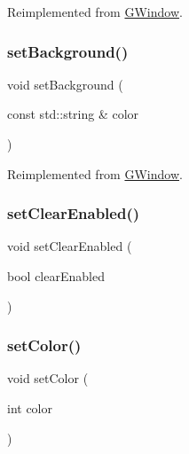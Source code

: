Reimplemented from \mbox{\hyperlink{classGWindow_a427fefbbc34e39e5df27a807da488e0d}{G\+Window}}.

\mbox{\label{classGConsoleWindow_a222fcfb542aa6094c7e0de671bd69627}} 
\subsubsection{\texorpdfstring{set\+Background()}{setBackground()}\hspace{0.1cm}{\footnotesize\ttfamily [2/2]}}
{\footnotesize\ttfamily void set\+Background (\begin{DoxyParamCaption}\item[{const std\+::string \&}]{color }\end{DoxyParamCaption})\hspace{0.3cm}{\ttfamily [virtual]}}



Reimplemented from \mbox{\hyperlink{classGWindow_a222fcfb542aa6094c7e0de671bd69627}{G\+Window}}.

\mbox{\label{classGConsoleWindow_a9d6a359503a0bc164ae8ea1389cff050}} 
\subsubsection{\texorpdfstring{set\+Clear\+Enabled()}{setClearEnabled()}}
{\footnotesize\ttfamily void set\+Clear\+Enabled (\begin{DoxyParamCaption}\item[{bool}]{clear\+Enabled }\end{DoxyParamCaption})\hspace{0.3cm}{\ttfamily [virtual]}}

\mbox{\label{classGConsoleWindow_a292eb0ce61f3fdb1d28b17e1e34928f7}} 
\subsubsection{\texorpdfstring{set\+Color()}{setColor()}\hspace{0.1cm}{\footnotesize\ttfamily [1/2]}}
{\footnotesize\ttfamily void set\+Color (\begin{DoxyParamCaption}\item[{int}]{color }\end{DoxyParamCaption})\hspace{0.3cm}{\ttfamily [virtual]}}



